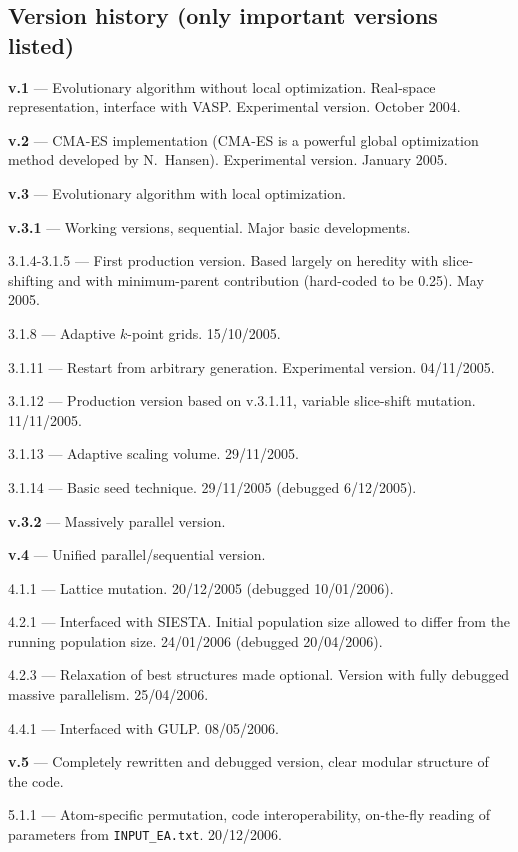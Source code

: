 \documentclass[12pt]{article}
\newcommand{\file}[1]{\texttt{#1}}
\begin{document}

\subsection{Version history (only important versions listed)}

{\small
\textbf{v.1} --- Evolutionary algorithm without local optimization. Real-space
representation, interface with VASP. Experimental version. October 2004.

\textbf{v.2} --- CMA-ES implementation (CMA-ES is a powerful global optimization
method developed by N.~Hansen). Experimental version. January 2005.

\textbf{v.3} --- Evolutionary algorithm with local optimization.

\textbf{v.3.1} --- Working versions, sequential. Major basic developments. 

3.1.4-3.1.5 --- First production version. Based largely on heredity with
slice-shifting and with minimum-parent contribution (hard-coded to be 0.25). May
2005.

3.1.8 --- Adaptive $k$-point grids. 15/10/2005. 

3.1.11 --- Restart from arbitrary generation. Experimental version. 04/11/2005. 

3.1.12 --- Production version based on v.3.1.11, variable slice-shift mutation.
11/11/2005.

3.1.13 --- Adaptive scaling volume. 29/11/2005.

3.1.14 --- Basic seed technique. 29/11/2005 (debugged 6/12/2005). 

\textbf{v.3.2} --- Massively parallel version. 

\textbf{v.4} --- Unified parallel/sequential version. 

4.1.1 --- Lattice mutation. 20/12/2005 (debugged 10/01/2006).

4.2.1 --- Interfaced with SIESTA. Initial population size allowed to differ from
the running population size. 24/01/2006 (debugged 20/04/2006).

4.2.3 --- Relaxation of best structures made optional. Version with fully
debugged massive parallelism. 25/04/2006.

4.4.1 --- Interfaced with GULP. 08/05/2006.

\textbf{v.5} --- Completely rewritten and debugged version, clear modular
structure of the code.

5.1.1 --- Atom-specific permutation, code interoperability, on-the-fly reading
of parameters from \file{INPUT\_EA.txt}. 20/12/2006.

}
\end{document}

